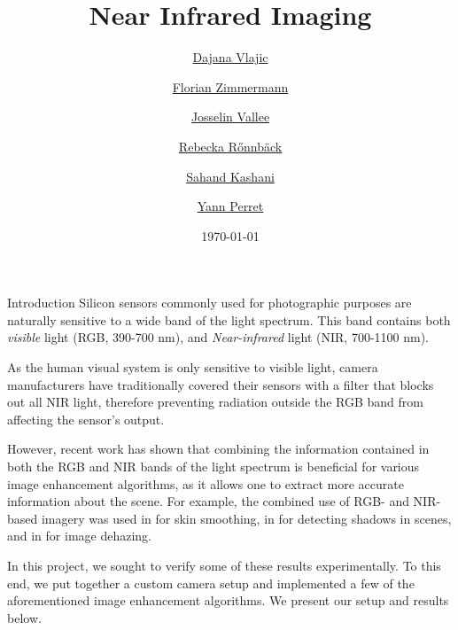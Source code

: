 \documentclass[11pt]{article}
\title{Near Infrared Imaging}
\author{
    \href{mailto:dajana.vlajic@epfl.ch}{Dajana Vlajic} \and
    \href{mailto:florian.zimmermann@epfl.ch}{Florian Zimmermann} \and
    \href{mailto:josselin.vallee@epfl.ch}{Josselin Vallee} \and
    \href{mailto:rebecka.ronnback@epfl.ch}{Rebecka R{\H o}nnb{\"a}ck} \and
    \href{mailto:sahand.kashani-akhavan@epfl.ch}{Sahand Kashani} \and
    \href{mailto:yann.perret@epfl.ch}{Yann Perret}
}
\date{\today}
\begin{document}
\maketitle

\begin{section}{Introduction}
    \label{sec:introduction}
    Silicon sensors commonly used for photographic purposes are naturally sensitive to a wide band of the light spectrum. This band contains both \emph{visible} light (RGB, 390-700 nm), and \emph{Near-infrared} light (NIR, 700-1100 nm).

    \medskip

    As the human visual system is only sensitive to visible light, camera manufacturers have traditionally covered their sensors with a filter that blocks out all NIR light, therefore preventing radiation outside the RGB band from affecting the sensor's output.

    \medskip

    However, recent work has shown that combining the information contained in both the RGB and NIR bands of the light spectrum is beneficial for various image enhancement algorithms, as it allows one to extract more accurate information about the scene. For example, the combined use of RGB- and NIR-based imagery was used in \cite{skin} for skin smoothing, in \cite{shadow} for detecting shadows in scenes, and in \cite{dehazing} for image dehazing.

    \medskip

    In this project, we sought to verify some of these results experimentally. To this end, we put together a custom camera setup and implemented a few of the aforementioned image enhancement algorithms. We present our setup and results below.

\end{section}
\end{document}
